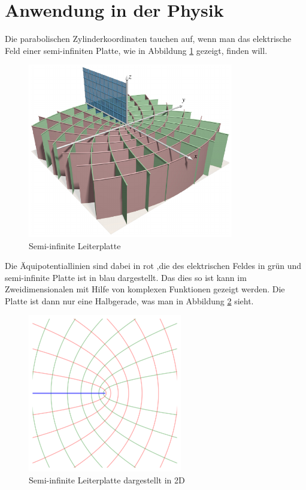 %
%
%

\section{Anwendung in der Physik 
	\label{parzyl:section:teil2}}

Die parabolischen Zylinderkoordinaten tauchen auf, wenn man das elektrische Feld einer semi-infiniten Platte, wie in Abbildung \ref{parzyl:fig:leiterplatte} gezeigt, finden will.
\begin{figure}
	\centering
	\includegraphics[width=0.8\textwidth]{papers/parzyl/images/halfplane.pdf}
	\caption{Semi-infinite Leiterplatte}
	\label{parzyl:fig:leiterplatte}
\end{figure}
Die Äquipotentiallinien sind dabei in rot ,die des elektrischen Feldes in grün und semi-infinite Platte ist in blau dargestellt.
Das dies so ist kann im Zweidimensionalen mit Hilfe von komplexen Funktionen gezeigt werden. Die Platte ist dann nur eine Halbgerade, was man in Abbildung \ref{parzyl:fig:leiterplatte_2d} sieht.
\begin{figure}
	\centering
	\includegraphics[width=0.6\textwidth]{papers/parzyl/img/Plane_2D.png}
	\caption{Semi-infinite Leiterplatte dargestellt in 2D}
	\label{parzyl:fig:leiterplatte_2d}
\end{figure}

